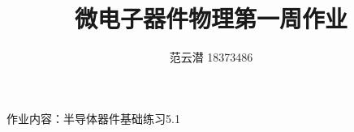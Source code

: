 \documentclass[lang=cn,11pt,a4paper,cite=authoryear]{elegantpaper}
\title{微电子器件物理\quad 第一周作业}
\author{范云潜 18373486}
\institute{微电子学院 184111 班}
\date{\zhtoday}
\begin{document}
\maketitle

作业内容：半导体器件基础练习5.1

\tableofcontents




\end{document}

